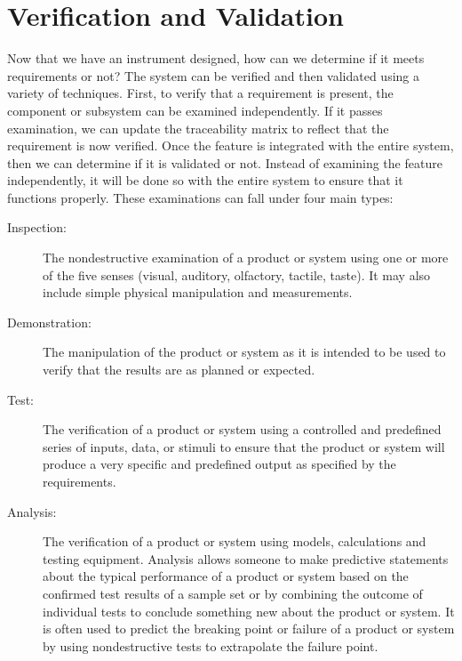 \chapter{Verification and Validation} 
Now that we have an instrument designed, how can we determine if it meets requirements or not?
The system can be verified and then validated using a variety of techniques.
First, to verify that a requirement is present, the component or subsystem can be examined independently.
If it passes examination, we can update the traceability matrix to reflect that the requirement is now verified.
Once the feature is integrated with the entire system, then we can determine if it is validated or not.
Instead of examining the feature independently, it will be done so with the entire system to ensure that it functions properly.
These examinations can fall under four main types:

{
\renewcommand{\descriptionlabel}[1]{\hspace{\labelsep}\textbf{#1}}
\begin{description}
    \item[Inspection:] The nondestructive examination of a product or system using one or more of the five senses (visual, auditory, olfactory, tactile, taste). 
    It may also include simple physical manipulation and measurements.
    
    \item[Demonstration:] The manipulation of the product or system as it is intended to be used to verify that the results are as planned or expected.								
    
    \item[Test:] The verification of a product or system using a controlled and predefined series of inputs, data, or stimuli to ensure that the product or system will produce a very specific and predefined output as specified by the requirements.								
    
    \item[Analysis:] The verification of a product or system using models, calculations and testing equipment.
    Analysis allows someone to make predictive statements about the typical performance of a product or system based on the confirmed test results of a sample set or by combining the outcome of individual tests to conclude something new about the product or system.
    It is often used to predict the breaking point or failure of a product or system by using nondestructive tests to extrapolate the failure point.
\end{description}
}

